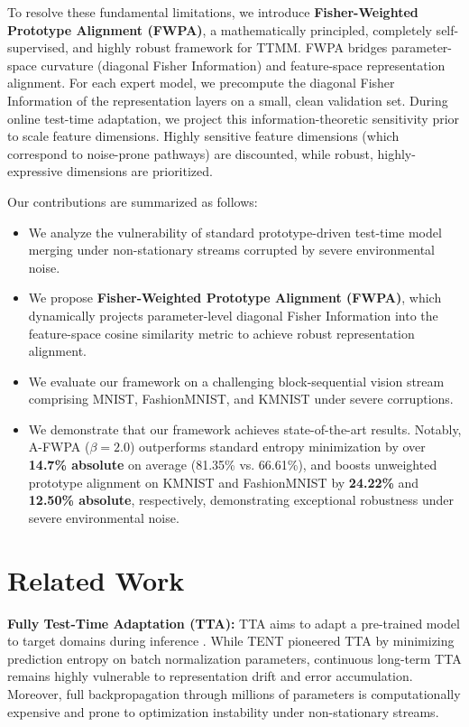 \documentclass{article}
\theoremstyle{plain}
\theoremstyle{definition}
\theoremstyle{remark}
\begin{document}
To resolve these fundamental limitations, we introduce \textbf{Fisher-Weighted Prototype Alignment (FWPA)}, a mathematically principled, completely self-supervised, and highly robust framework for TTMM. FWPA bridges parameter-space curvature (diagonal Fisher Information) and feature-space representation alignment. For each expert model, we precompute the diagonal Fisher Information of the representation layers on a small, clean validation set. During online test-time adaptation, we project this information-theoretic sensitivity prior to scale feature dimensions. Highly sensitive feature dimensions (which correspond to noise-prone pathways) are discounted, while robust, highly-expressive dimensions are prioritized.

Our contributions are summarized as follows:
\begin{itemize}
    \item We analyze the vulnerability of standard prototype-driven test-time model merging under non-stationary streams corrupted by severe environmental noise.
    \item We propose \textbf{Fisher-Weighted Prototype Alignment (FWPA)}, which dynamically projects parameter-level diagonal Fisher Information into the feature-space cosine similarity metric to achieve robust representation alignment.
    \item We evaluate our framework on a challenging block-sequential vision stream comprising MNIST, FashionMNIST, and KMNIST under severe corruptions.
    \item We demonstrate that our framework achieves state-of-the-art results. Notably, A-FWPA ($\beta = 2.0$) outperforms standard entropy minimization by over \textbf{14.7\% absolute} on average (81.35\% vs. 66.61\%), and boosts unweighted prototype alignment on KMNIST and FashionMNIST by \textbf{24.22\%} and \textbf{12.50\% absolute}, respectively, demonstrating exceptional robustness under severe environmental noise.
\end{itemize}

\section{Related Work}
\label{submission-related}
\textbf{Fully Test-Time Adaptation (TTA):} TTA aims to adapt a pre-trained model to target domains during inference \citep{wang2021tent, liang2020shot}. While TENT \citep{wang2021tent} pioneered TTA by minimizing prediction entropy on batch normalization parameters, continuous long-term TTA remains highly vulnerable to representation drift and error accumulation. Moreover, full backpropagation through millions of parameters is computationally expensive and prone to optimization instability under non-stationary streams.
\end{document}
